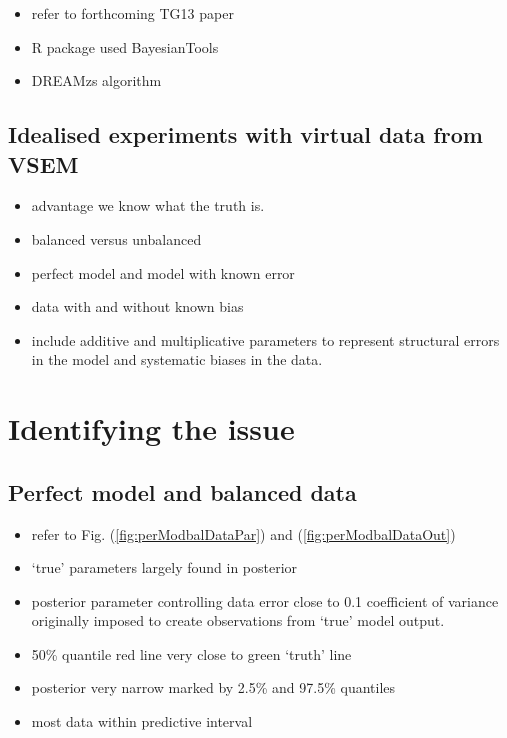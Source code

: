 \documentclass[]{article}
\providecommand{\tightlist}{%
  \setlength{\itemsep}{0pt}\setlength{\parskip}{0pt}}
\begin{document}
\begin{itemize}
\tightlist
\item
  refer to forthcoming TG13 paper
\item
  R package used BayesianTools
\item
  DREAMzs algorithm
\end{itemize}

\subsection{Idealised experiments with virtual data from
VSEM}\label{idealised-experiments-with-virtual-data-from-vsem}

\begin{itemize}
\tightlist
\item
  advantage we know what the truth is.
\item
  balanced versus unbalanced
\item
  perfect model and model with known error
\item
  data with and without known bias
\item
  include additive and multiplicative parameters to represent structural
  errors in the model and systematic biases in the data.
\end{itemize}

\section{Identifying the issue}\label{identifying-the-issue}

\subsection{Perfect model and balanced
data}\label{perfect-model-and-balanced-data}

\begin{itemize}
\tightlist
\item
  refer to Fig. (\ref{fig:perModbalDataPar}) and
  (\ref{fig:perModbalDataOut})
\item
  `true' parameters largely found in posterior
\item
  posterior parameter controlling data error close to 0.1 coefficient of
  variance originally imposed to create observations from `true' model
  output.
\item
  50\% quantile red line very close to green `truth' line
\item
  posterior very narrow marked by 2.5\% and 97.5\% quantiles
\item
  most data within predictive interval
\end{itemize}
\end{document}
